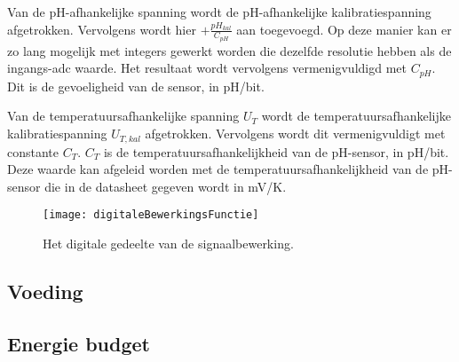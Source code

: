 Van de pH-afhankelijke spanning wordt de pH-afhankelijke kalibratiespanning afgetrokken. Vervolgens wordt hier $+\frac{pH_{kal}}{C_{pH}}$ aan toegevoegd. Op deze manier kan er zo lang mogelijk met integers gewerkt worden die dezelfde resolutie hebben als de ingangs-adc waarde. Het resultaat wordt vervolgens vermenigvuldigd met $C_{pH}$. Dit is de gevoeligheid van de sensor, in pH/bit.

Van de temperatuursafhankelijke spanning $U_T$ wordt de temperatuursafhankelijke kalibratiespanning $U_{T,kal}$ afgetrokken. Vervolgens wordt dit vermenigvuldigt met constante $C_T$. $C_T$ is de temperatuursafhankelijkheid van de pH-sensor, in pH/bit. Deze waarde kan afgeleid worden met de temperatuursafhankelijkheid van de pH-sensor die in de datasheet gegeven wordt in mV/K.

\begin{figure}[ht]
    \centering
    \texttt{[image: digitaleBewerkingsFunctie]}
    \caption{Het digitale gedeelte van de signaalbewerking.} 
    \label{fig:digitaleBewerkingsFunctie}
\end{figure}









\subsection{Voeding} \label{sec:voeding}
\subsection{Energie budget}




%
